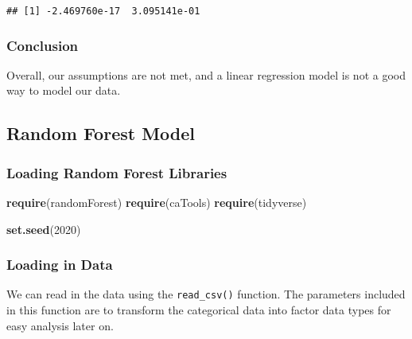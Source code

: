 \documentclass[
]{article}
\newenvironment{Shaded}{}{}
\newcommand{\DecValTok}[1]{\textcolor[rgb]{0.25,0.63,0.44}{#1}}
\newcommand{\KeywordTok}[1]{\textcolor[rgb]{0.00,0.44,0.13}{\textbf{#1}}}
\newcommand{\NormalTok}[1]{#1}
\begin{document}
\begin{verbatim}
## [1] -2.469760e-17  3.095141e-01
\end{verbatim}

\hypertarget{header-n942}{%
\subsubsection{Conclusion}\label{header-n942}}

Overall, our assumptions are not met, and a linear regression model is
not a good way to model our data.

\hypertarget{header-n944}{%
\subsection{Random Forest Model}\label{header-n944}}

\hypertarget{header-n945}{%
\subsubsection{Loading Random Forest Libraries}\label{header-n945}}

\begin{Shaded}
\begin{Highlighting}[]
\KeywordTok{require}\NormalTok{(randomForest)}
\KeywordTok{require}\NormalTok{(caTools)}
\KeywordTok{require}\NormalTok{(tidyverse)}

\KeywordTok{set.seed}\NormalTok{(}\DecValTok{2020}\NormalTok{)}
\end{Highlighting}
\end{Shaded}

\hypertarget{header-n947}{%
\subsubsection{Loading in Data}\label{header-n947}}

We can read in the data using the \texttt{read\_csv()} function. The
parameters included in this function are to transform the categorical
data into factor data types for easy analysis later on.
\end{document}
